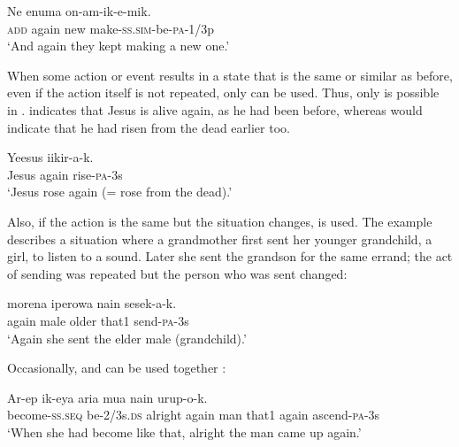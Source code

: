 \ea%
\label{ex:3:x1762}
\gll Ne  enuma on-am-ik-e-mik. \\
\textsc{add} again new make-\textsc{ss}.\textsc{sim}-be-\textsc{pa}-1/3p\\
\glt`And again they kept making a new one.'
\z

When some action or event results in a state that is the same or similar as before, even if the action itself is not repeated, only\textstyleStyleVernacularWordsItalic{}  can be used. Thus, only  is possible in .  indicates that Jesus is alive again, as he had been before, whereas  would indicate that he had risen from the dead earlier too.

\ea%
\label{ex:3:x503}
\gll Yeesus  iikir-a-k. \\
Jesus again rise-\textsc{pa}-3s\\
\glt`Jesus rose again (= rose from the dead).'
\z

Also, if the action is the same but the situation changes,  is used. The example  describes a situation where a grandmother first sent her younger grandchild, a girl, to listen to a sound. Later she sent the grandson for the same errand; the act of sending was repeated but the person who was sent changed:

\ea%
\label{ex:3:x1761}
\gll {} morena iperowa nain sesek-a-k. \\
again male older that1 send-\textsc{pa}-3s\\
\glt`Again she sent the elder male (grandchild).'
\z

Occasionally,  and  can be used together :

\ea%
\label{ex:3:x700}
\gll Ar-ep ik-eya aria  mua nain  urup-o-k.\\
become-\textsc{ss}.\textsc{seq} be-2/3s.\textsc{ds} alright again man that1 again ascend-\textsc{pa}-3s\\
\glt`When she had become like that, alright the man came up again.'
\z

